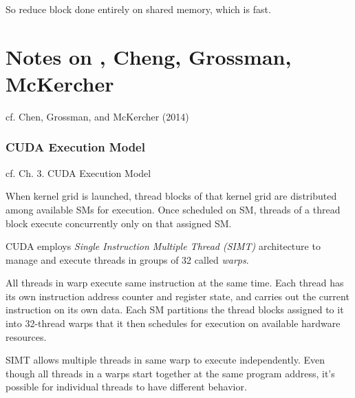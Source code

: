 \documentclass[10pt]{amsart}
\begin{document}
\begin{multicols*}{2}
So reduce block done entirely on shared memory, which is fast.  




\part{Notes on , Cheng, Grossman, McKercher}

cf. Chen, Grossman, and McKercher (2014) \cite{CGM2014}



\section{CUDA Execution Model}
cf. Ch. 3.  CUDA Execution Model 

When kernel grid is launched, thread blocks of that kernel grid are distributed among available SMs for execution.  Once scheduled on SM, threads of a thread block execute concurrently only on that assigned SM.  

CUDA employs \emph{Single Instruction Multiple Thread (SIMT)} architecture to manage and execute threads in groups of 32 called \emph{warps}.  

All threads in warp execute same instruction at the same time.  Each thread has its own instruction address counter and register state, and carries out the current instruction on its own data.  Each SM partitions the thread blocks assigned to it into 32-thread warps that it then schedules for execution on available hardware resources.  

SIMT allows multiple threads in same warp to execute independently.  Even though all threads in a warps start together at the same program address, it's possible for individual threads to have different behavior.  


\end{multicols*}
\end{document}
